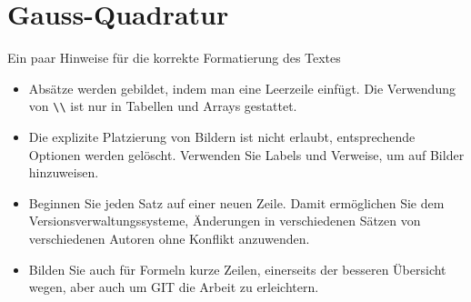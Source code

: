 %
%
%
\chapter{Gauss-Quadratur\label{chapter:quadratur}}
\begin{refsection}

Ein paar Hinweise für die korrekte Formatierung des Textes
\begin{itemize}
\item
Absätze werden gebildet, indem man eine Leerzeile einfügt.
Die Verwendung von \verb+\\+ ist nur in Tabellen und Arrays gestattet.
\item
Die explizite Platzierung von Bildern ist nicht erlaubt, entsprechende
Optionen werden gelöscht. 
Verwenden Sie Labels und Verweise, um auf Bilder hinzuweisen.
\item
Beginnen Sie jeden Satz auf einer neuen Zeile. 
Damit ermöglichen Sie dem Versionsverwaltungssysteme, Änderungen
in verschiedenen Sätzen von verschiedenen Autoren ohne Konflikt 
anzuwenden.
\item 
Bilden Sie auch für Formeln kurze Zeilen, einerseits der besseren
Übersicht wegen, aber auch um GIT die Arbeit zu erleichtern.
\end{itemize}






\printbibliography[heading=subbibliography]
\end{refsection}
